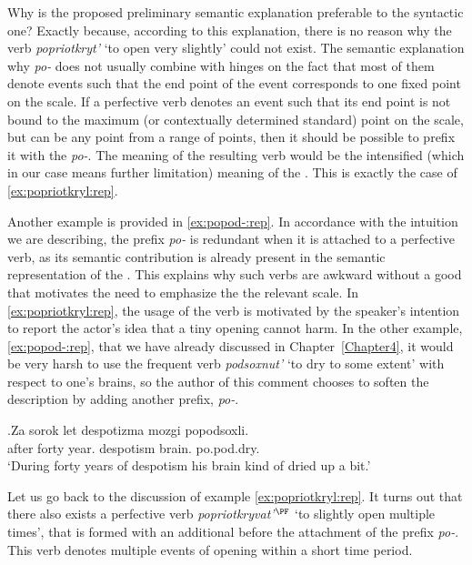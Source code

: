 Why is the proposed preliminary semantic explanation preferable to the syntactic one? Exactly because, according to this explanation, there is no reason why the verb \textit{popriotkryt'} `to open very slightly' could not exist. The semantic explanation why \textit{po-} does not usually combine with  hinges on the fact that most of them denote events such that the end point of the event corresponds to one fixed point on the scale. If a perfective verb denotes an event such that its end point is not bound to the maximum (or contextually determined standard) point on the scale, but can be any point from a range of points, then it should be possible to prefix it with the  \textit{po-}. The meaning of the resulting verb would be the intensified (which in our case means further limitation) meaning of the . This is exactly the case of \ref{ex:popriotkryl:rep}.

Another example is provided in \ref{ex:popod-:rep}. In accordance with the intuition we are describing, the  prefix \textit{po-} is redundant when it is attached to a perfective verb, as its semantic contribution is already present in the semantic representation of the . This explains why such verbs are awkward without a good  that motivates the need to emphasize the  the relevant scale. In \ref{ex:popriotkryl:rep}, the usage of the verb is motivated by the speaker's intention to report the actor's idea that a tiny opening cannot harm. In the other example, \ref{ex:popod-:rep}, that we have already discussed in Chapter~\ref{Chapter4}, it would be very harsh to use the frequent verb \textit{podsoxnut'} `to dry to some extent' with respect to one's brains, so the author of this comment chooses to soften the description by adding another  prefix, \textit{po-}. 

\exg.\label{ex:popod-:rep}Za sorok let despotizma mozgi popodsoxli.\\
after forty year. despotism brain. po.pod.dry.\\
\trans `During forty years of despotism his brain kind of dried up a bit.'\\

Let us go back to the discussion of example \ref{ex:popriotkryl:rep}. It turns out that there also exists a perfective verb \textit{popriotkryvat'}$^{\PF}$ `to slightly open multiple times', that is formed with an additional  before the attachment of the prefix \textit{po-}. This verb denotes multiple events of opening within a short time period. 


